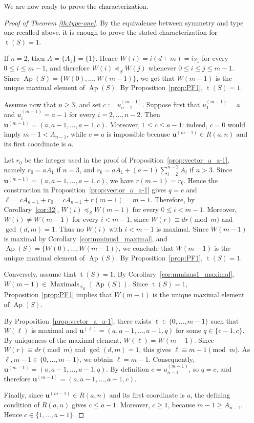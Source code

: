 \documentclass[12pt,a4paper]{amsart}
\theoremstyle{definition}
\begin{document}
We are now ready to prove the characterization.

\begin{proof}[Proof of Theorem \ref{th:type-one}]
By the equivalence between symmetry and type one recalled above, it is enough
to prove the stated characterization for $\operatorname{t}(S)=1$.

If $n=2$, then $A=\{A_1\}=\{1\}$. Hence $W(i)=i(d+m)=is_1$ for every
$0\le i\le m-1$, and therefore $W(i)\preceq_S W(j)$ whenever
$0\le i\le j\le m-1$. Since $\operatorname{Ap}(S)=\{W(0),\ldots,W(m-1)\}$,
we get that $W(m-1)$ is the unique maximal element of $\operatorname{Ap}(S)$.
By Proposition~\ref{prop:PF1}, $\operatorname{t}(S)=1$.

Assume now that $n\ge 3$, and set $c:=u_{n-1}^{(m-1)}$. Suppose first
that $u_1^{(m-1)}=a$ and $u_i^{(m-1)}=a-1$ for every
$i=2,\ldots,n-2$. Then
$\mathbf u^{(m-1)}=(a,a-1,\ldots,a-1,c)$. Moreover, $1\le c\le a-1$:
indeed, $c=0$ would imply $m-1<A_{n-1}$, while $c=a$ is impossible
because $\mathbf u^{(m-1)}\in R(a,n)$ and its first coordinate is $a$. 

Let $r_0$ be the
integer used in the proof of Proposition~\ref{prop:vector_a_a-1}, namely
$r_0=aA_1$ if $n=3$, and
$r_0=aA_1+(a-1)\sum_{i=2}^{n-2}A_i$ if $n>3$. Since
$\mathbf{u}^{(m-1)}=(a,a-1,\ldots,a-1,c)$, we have $r(m-1)=r_0$. Hence the
construction in Proposition~\ref{prop:vector_a_a-1} gives $q=c$ and
$\ell=cA_{n-1}+r_0=cA_{n-1}+r(m-1)=m-1$. Therefore, by
Corollary~\ref{cor:32}, $W(i)\preceq_S W(m-1)$ for every $0\le i<m-1$.
Moreover, $W(i)\ne W(m-1)$ for every $i<m-1$, since
$W(r)\equiv dr\pmod m$ and $\gcd(d,m)=1$. Thus no $W(i)$ with $i<m-1$ is
maximal. Since $W(m-1)$ is maximal by Corollary~\ref{cor:mminus1_maximal},
and $\operatorname{Ap}(S)=\{W(0),\ldots,W(m-1)\}$, we conclude that
$W(m-1)$ is the unique maximal element of $\operatorname{Ap}(S)$. By
Proposition~\ref{prop:PF1}, $\operatorname{t}(S)=1$.

Conversely, assume that $\operatorname{t}(S)=1$. By
Corollary~\ref{cor:mminus1_maximal}, $W(m-1) \in \operatorname{Maximals}_{\preceq_S}(\operatorname{Ap}(S))$. Since $\operatorname{t}(S)=1$,
Proposition~\ref{prop:PF1} implies that $W(m-1)$ is the unique maximal
element of $\operatorname{Ap}(S)$.

By Proposition~\ref{prop:vector_a_a-1}, there exists
$\ell\in\{0,\ldots,m-1\}$ such that $W(\ell)$ is maximal and
$\mathbf{u}^{(\ell)}=(a,a-1,\ldots,a-1,q)$ for some $q\in\{c-1,c\}$. By uniqueness
of the maximal element, $W(\ell)=W(m-1)$. Since $W(r)\equiv dr\pmod m$ and
$\gcd(d,m)=1$, this gives $\ell\equiv m-1\pmod m$. As
$\ell,m-1\in\{0,\ldots,m-1\}$, we obtain $\ell=m-1$. Consequently, $\mathbf{u}^{(m-1)}=(a,a-1,\ldots,a-1,q)$. By definition
$c=u^{(m-1)}_{n-1}$, so $q=c$, and therefore
$\mathbf{u}^{(m-1)}=(a,a-1,\ldots,a-1,c)$.

Finally, since $\mathbf{u}^{(m-1)}\in R(a,n)$ and its first coordinate is $a$, the defining
condition of $R(a,n)$ gives $c\le a-1$. Moreover, $c\ge 1$, because
$m-1\ge A_{n-1}$. Hence $c\in\{1,\ldots,a-1\}$.
\end{proof}
\end{document}
